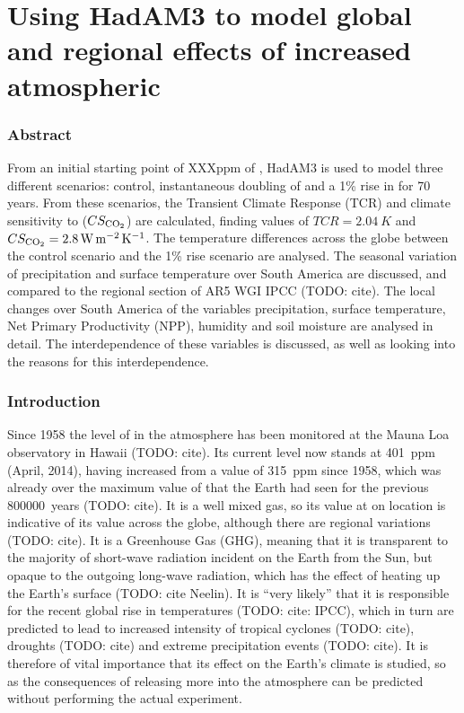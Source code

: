 \documentclass{article}
\begin{document}
\part*{Using HadAM3 to model global and regional effects of increased atmospheric }

\section*{Abstract}

From an initial starting point of XXXppm of , HadAM3 is used to model three different scenarios: control, instantaneous doubling of  and a 1\% rise in  for 70 years. From these scenarios, the Transient Climate Response (TCR) and climate sensitivity to  ($CS_{\ce{CO2}}$) are calculated, finding values of $TCR = \SI{2.04}{K}$ and $CS_{\ce{CO2}} = \SI{2.8}{W.m^{-2}.K^{-1}}$. The temperature differences across the globe between the control scenario and the 1\% rise scenario are analysed. The seasonal variation of precipitation and surface temperature over South America are discussed, and compared to the regional section of AR5 WGI IPCC (TODO: cite). The local changes over South America of the variables precipitation, surface temperature, Net Primary Productivity (NPP), humidity and soil moisture are analysed in detail. The interdependence of these variables is discussed, as well as looking into the reasons for this interdependence.

\section{Introduction}

Since 1958 the level of  in the atmosphere has been monitored at the Mauna Loa observatory in Hawaii (TODO: cite). Its current level now stands at \SI{401}{ppm} (April, 2014), having increased from a value of \SI{315}{ppm} since 1958, which was already over the maximum value of  that the Earth had seen for the previous \SI{800 000}{years} (TODO: cite). It is a well mixed gas, so its value at on location is indicative of its value across the globe, although there are regional variations (TODO: cite). It is a Greenhouse Gas (GHG), meaning that it is transparent to the majority of short-wave radiation incident on the Earth from the Sun, but opaque to the outgoing long-wave radiation, which has the effect of heating up the Earth's surface (TODO: cite Neelin). It is ``very likely'' that it is responsible for the recent global rise in temperatures (TODO: cite: IPCC), which in turn are predicted to lead to increased intensity of tropical cyclones (TODO: cite), droughts (TODO: cite) and extreme precipitation events (TODO: cite). It is therefore of vital importance that its effect on the Earth's climate is studied, so as the consequences of releasing more  into the atmosphere can be predicted without performing the actual experiment.
\end{document}
